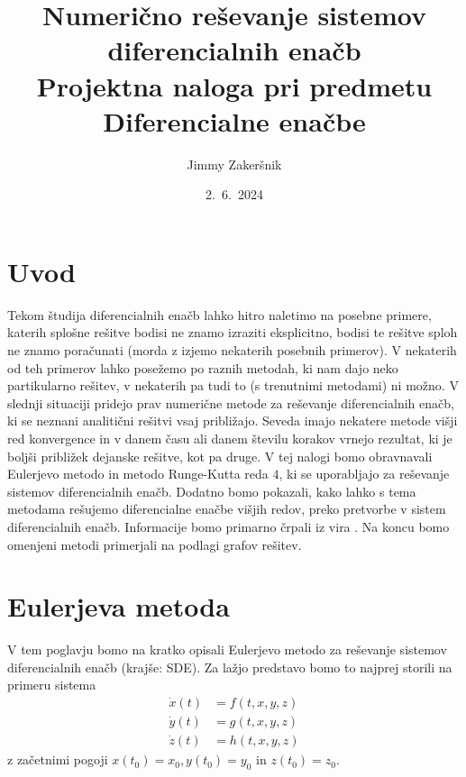 \documentclass[a4paper, 10pt]{article}
\title{Numerično reševanje sistemov diferencialnih enačb \\ {\large Projektna naloga pri predmetu Diferencialne enačbe}}
\date{2.~6.~2024}
\author{Jimmy Zakeršnik}
\begin{document}
	\maketitle
	\thispagestyle{empty}
	\newpage
	\tableofcontents
	\newpage
	\section{Uvod}
	Tekom študija diferencialnih enačb lahko hitro naletimo na posebne primere, katerih splošne rešitve bodisi ne znamo izraziti eksplicitno, bodisi te rešitve sploh ne znamo poračunati (morda z izjemo nekaterih posebnih primerov). V nekaterih od teh primerov lahko posežemo po raznih metodah, ki nam dajo neko partikularno rešitev, v nekaterih pa tudi to (s trenutnimi metodami) ni možno. V slednji situaciji pridejo prav numerične metode za reševanje diferencialnih enačb, ki se neznani analitični rešitvi vsaj približajo. Seveda imajo nekatere metode višji red konvergence in v danem času ali danem številu korakov vrnejo rezultat, ki je boljši približek dejanske rešitve, kot pa druge. V tej nalogi bomo obravnavali Eulerjevo metodo in metodo Runge-Kutta reda $4$, ki se uporabljajo za reševanje sistemov diferencialnih enačb. Dodatno bomo pokazali, kako lahko s tema metodama rešujemo diferencialne enačbe višjih redov, preko pretvorbe v sistem diferencialnih enačb. Informacije bomo primarno črpali iz vira \cite{bib:Matlab}. Na koncu bomo omenjeni metodi primerjali na podlagi grafov rešitev.
	\section{Eulerjeva metoda}
		V tem poglavju bomo na kratko opisali Eulerjevo metodo za reševanje sistemov diferencialnih enačb (krajše: SDE). Za lažjo predstavo bomo to najprej storili na primeru sistema \begin{align*}
			\dot{x}(t) &= f(t, x, y, z) \\
			\dot{y}(t) &= g(t, x, y, z) \\
			\dot{z}(t) &= h(t, x, y, z)
		\end{align*} z začetnimi pogoji $x(t_0) = x_0, y(t_0) = y_0$ in $z(t_0) = z_0$.
		
\end{document}
